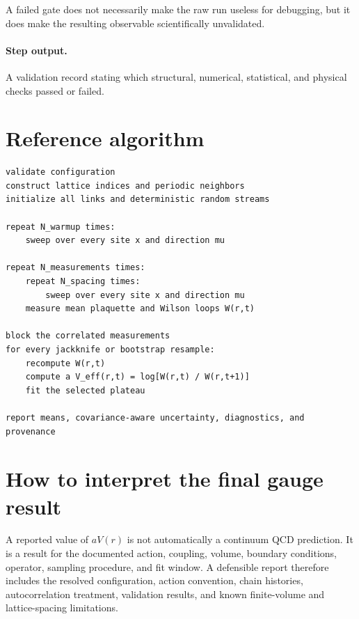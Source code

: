 \documentclass[11pt]{article}
\begin{document}
A failed gate does not necessarily make the raw run useless for debugging, but
it does make the resulting observable scientifically unvalidated.

\paragraph{Step output.}
A validation record stating which structural, numerical, statistical, and
physical checks passed or failed.

\section{Reference algorithm}

\begin{verbatim}
validate configuration
construct lattice indices and periodic neighbors
initialize all links and deterministic random streams

repeat N_warmup times:
    sweep over every site x and direction mu

repeat N_measurements times:
    repeat N_spacing times:
        sweep over every site x and direction mu
    measure mean plaquette and Wilson loops W(r,t)

block the correlated measurements
for every jackknife or bootstrap resample:
    recompute W(r,t)
    compute a V_eff(r,t) = log[W(r,t) / W(r,t+1)]
    fit the selected plateau

report means, covariance-aware uncertainty, diagnostics, and provenance
\end{verbatim}

\section{How to interpret the final gauge result}

A reported value of \(aV(r)\) is not automatically a continuum QCD prediction.
It is a result for the documented action, coupling, volume, boundary conditions,
operator, sampling procedure, and fit window. A defensible report therefore
includes the resolved configuration, action convention, chain histories,
autocorrelation treatment, validation results, and known finite-volume and
lattice-spacing limitations.
\end{document}
